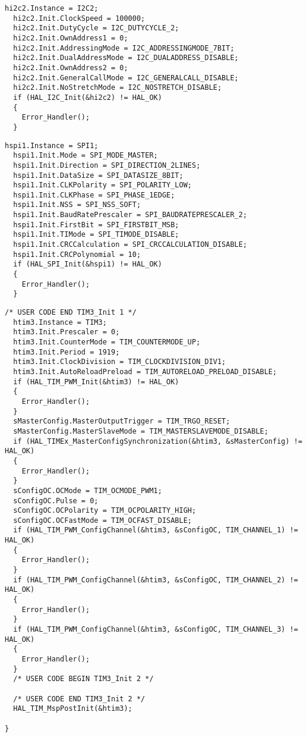 \begin{lstlisting}[caption={i2c instance},label={lst:Registers}]
 hi2c2.Instance = I2C2;
  hi2c2.Init.ClockSpeed = 100000;
  hi2c2.Init.DutyCycle = I2C_DUTYCYCLE_2;
  hi2c2.Init.OwnAddress1 = 0;
  hi2c2.Init.AddressingMode = I2C_ADDRESSINGMODE_7BIT;
  hi2c2.Init.DualAddressMode = I2C_DUALADDRESS_DISABLE;
  hi2c2.Init.OwnAddress2 = 0;
  hi2c2.Init.GeneralCallMode = I2C_GENERALCALL_DISABLE;
  hi2c2.Init.NoStretchMode = I2C_NOSTRETCH_DISABLE;
  if (HAL_I2C_Init(&hi2c2) != HAL_OK)
  {
    Error_Handler();
  }
\end{lstlisting}

\begin{lstlisting}[caption={SPI instance},label={lst:Registers}]
  hspi1.Instance = SPI1;
  hspi1.Init.Mode = SPI_MODE_MASTER;
  hspi1.Init.Direction = SPI_DIRECTION_2LINES;
  hspi1.Init.DataSize = SPI_DATASIZE_8BIT;
  hspi1.Init.CLKPolarity = SPI_POLARITY_LOW;
  hspi1.Init.CLKPhase = SPI_PHASE_1EDGE;
  hspi1.Init.NSS = SPI_NSS_SOFT;
  hspi1.Init.BaudRatePrescaler = SPI_BAUDRATEPRESCALER_2;
  hspi1.Init.FirstBit = SPI_FIRSTBIT_MSB;
  hspi1.Init.TIMode = SPI_TIMODE_DISABLE;
  hspi1.Init.CRCCalculation = SPI_CRCCALCULATION_DISABLE;
  hspi1.Init.CRCPolynomial = 10;
  if (HAL_SPI_Init(&hspi1) != HAL_OK)
  {
    Error_Handler();
  }
\end{lstlisting}

\begin{lstlisting}[caption={TIM3 setup},label={lst:Registers}]
 /* USER CODE END TIM3_Init 1 */
  htim3.Instance = TIM3;
  htim3.Init.Prescaler = 0;
  htim3.Init.CounterMode = TIM_COUNTERMODE_UP;
  htim3.Init.Period = 1919;
  htim3.Init.ClockDivision = TIM_CLOCKDIVISION_DIV1;
  htim3.Init.AutoReloadPreload = TIM_AUTORELOAD_PRELOAD_DISABLE;
  if (HAL_TIM_PWM_Init(&htim3) != HAL_OK)
  {
    Error_Handler();
  }
  sMasterConfig.MasterOutputTrigger = TIM_TRGO_RESET;
  sMasterConfig.MasterSlaveMode = TIM_MASTERSLAVEMODE_DISABLE;
  if (HAL_TIMEx_MasterConfigSynchronization(&htim3, &sMasterConfig) != HAL_OK)
  {
    Error_Handler();
  }
  sConfigOC.OCMode = TIM_OCMODE_PWM1;
  sConfigOC.Pulse = 0;
  sConfigOC.OCPolarity = TIM_OCPOLARITY_HIGH;
  sConfigOC.OCFastMode = TIM_OCFAST_DISABLE;
  if (HAL_TIM_PWM_ConfigChannel(&htim3, &sConfigOC, TIM_CHANNEL_1) != HAL_OK)
  {
    Error_Handler();
  }
  if (HAL_TIM_PWM_ConfigChannel(&htim3, &sConfigOC, TIM_CHANNEL_2) != HAL_OK)
  {
    Error_Handler();
  }
  if (HAL_TIM_PWM_ConfigChannel(&htim3, &sConfigOC, TIM_CHANNEL_3) != HAL_OK)
  {
    Error_Handler();
  }
  /* USER CODE BEGIN TIM3_Init 2 */

  /* USER CODE END TIM3_Init 2 */
  HAL_TIM_MspPostInit(&htim3);

}
\end{lstlisting}

